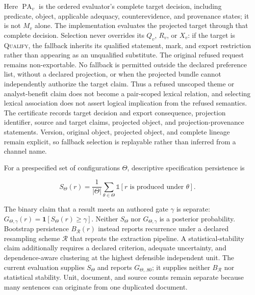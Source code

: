 \documentclass[manuscript,screen,review,anonymous]{acmart}
\begin{document}
Here $\operatorname{PA}_v$ is the ordered evaluator's complete target decision, including predicate, object, applicable adequacy, counterevidence, and provenance states; it is not $M_v$ alone. The implementation evaluates the projected target through that complete decision. Selection never overrides its $Q_v$, $R_v$, or $X_v$: if the target is \textsc{Qualify}, the fallback inherits its qualified statement, mark, and export restriction rather than appearing as an unqualified substitute. The original refused request remains non-exportable. No fallback is permitted outside the declared preference list, without a declared projection, or when the projected bundle cannot independently authorize the target claim. Thus a refused unscoped theme or analyst-benefit claim does not become a pair-scoped lexical relation, and selecting lexical association does not assert logical implication from the refused semantics. The certificate records target decision and export consequence, projection identifier, source and target claims, projected object, and projection-provenance statements. Version, original object, projected object, and complete lineage remain explicit, so fallback selection is replayable rather than inferred from a channel name.

For a prespecified set of configurations $\Theta$, descriptive specification persistence is

\begin{equation}
S_{\Theta}(r)=\frac{1}{|\Theta|}\sum_{\theta\in\Theta}
\mathbb{1}[r\text{ is produced under }\theta].
\end{equation}

The binary claim that a result meets an authored gate $\gamma$ is separate: $G_{\Theta,\gamma}(r)=\mathbf{1}[S_{\Theta}(r)\geq\gamma]$. Neither $S_{\Theta}$ nor $G_{\Theta,\gamma}$ is a posterior probability. Bootstrap persistence $B_{\mathcal{R}}(r)$ instead reports recurrence under a declared resampling scheme $\mathcal{R}$ that repeats the extraction pipeline. A statistical-stability claim additionally requires a declared criterion, adequate uncertainty, and dependence-aware clustering at the highest defensible independent unit. The current evaluation supplies $S_{\Theta}$ and reports $G_{\Theta,.80}$; it supplies neither $B_{\mathcal{R}}$ nor statistical stability. Unit, document, and source counts remain separate because many sentences can originate from one duplicated document.
\end{document}
